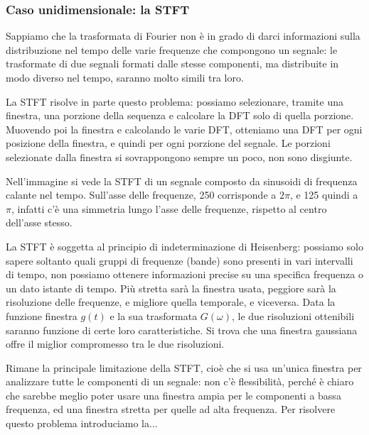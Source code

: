 \documentclass[a4paper,11pt]{article}
\begin{document}
\subsubsection{Caso unidimensionale: la STFT}
Sappiamo che la trasformata di Fourier non è in grado di darci informazioni sulla distribuzione nel tempo delle varie frequenze che compongono un segnale: le trasformate
di due segnali formati dalle stesse componenti, ma distribuite in modo diverso nel tempo, saranno molto simili tra loro.
\par
La STFT risolve in parte questo problema: possiamo selezionare, tramite una finestra, una porzione della sequenza e calcolare la DFT solo di quella porzione. Muovendo poi la finestra e
calcolando le varie DFT, otteniamo una DFT per ogni posizione della finestra, e quindi per ogni porzione del segnale. Le porzioni selezionate dalla finestra si sovrappongono sempre un poco, non
sono disgiunte.
\par
Nell'immagine si vede la STFT di un segnale composto da sinusoidi di frequenza calante nel tempo. Sull'asse delle frequenze, 250 corrisponde a $2\pi$, e 125 quindi a $\pi$, infatti
c'è una simmetria lungo l'asse delle frequenze, rispetto al centro dell'asse stesso.
\par
La STFT è soggetta al principio di indeterminazione di Heisenberg: possiamo solo sapere soltanto quali gruppi di frequenze (bande) sono presenti in vari intervalli di tempo,
non possiamo ottenere informazioni precise su una specifica frequenza o un dato istante di tempo. Più stretta sarà la finestra usata, peggiore sarà la risoluzione delle frequenze, e migliore
quella temporale, e viceversa. Data la funzione finestra $g(t)$ e la sua trasformata $G(\omega)$, le due risoluzioni ottenibili saranno funzione di certe loro caratteristiche. Si trova che una finestra
gaussiana offre il miglior compromesso tra le due risoluzioni.
\par
Rimane la principale limitazione della STFT, cioè che si usa un'unica finestra per analizzare tutte le componenti di un segnale: non c'è flessibilità, perché è chiaro che sarebbe
meglio poter usare una finestra ampia per le componenti a bassa frequenza, ed una finestra stretta per quelle ad alta frequenza. Per risolvere questo problema introduciamo la...
\end{document}
